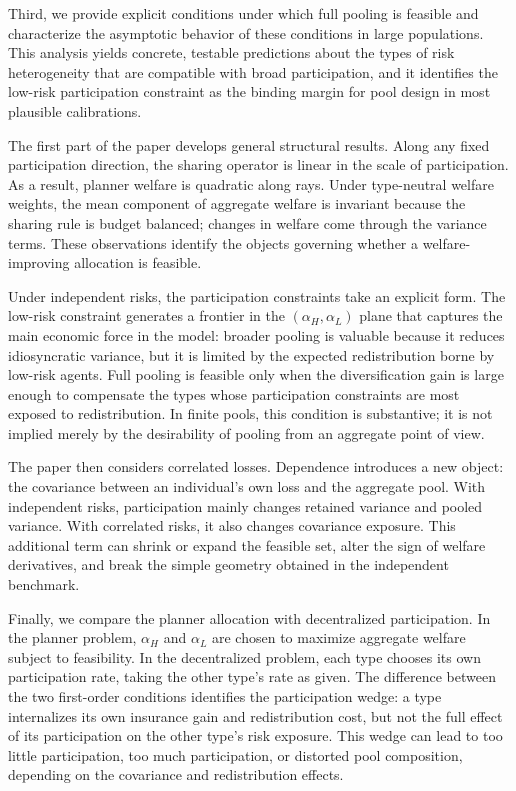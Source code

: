 \documentclass[a4paper,12pt]{article}
\theoremstyle{definition}
\theoremstyle{remark}
\newcommand{\1}{\mathbf{1}}
\begin{document}
Third, we provide explicit conditions under which full pooling is feasible and characterize the asymptotic behavior of these conditions in large populations. This analysis yields concrete, testable predictions about the types of risk heterogeneity that are compatible with broad participation, and it identifies the low-risk participation constraint as the binding margin for pool design in most plausible calibrations.

The first part of the paper develops general structural results. Along any fixed participation direction, the sharing operator is linear in the scale of participation. As a result, planner welfare is quadratic along rays. Under type-neutral welfare weights, the mean component of aggregate welfare is invariant because the sharing rule is budget balanced; changes in welfare come through the variance terms. These observations identify the objects governing whether a welfare-improving allocation is feasible.

Under independent risks, the participation constraints take an explicit form. The low-risk constraint generates a frontier in the \((\alpha_H,\alpha_L)\) plane that captures the main economic force in the model: broader pooling is valuable because it reduces idiosyncratic variance, but it is limited by the expected redistribution borne by low-risk agents. Full pooling is feasible only when the diversification gain is large enough to compensate the types whose participation constraints are most exposed to redistribution. In finite pools, this condition is substantive; it is not implied merely by the desirability of pooling from an aggregate point of view.

The paper then considers correlated losses. Dependence introduces a new object: the covariance between an individual's own loss and the aggregate pool. With independent risks, participation mainly changes retained variance and pooled variance. With correlated risks, it also changes covariance exposure. This additional term can shrink or expand the feasible set, alter the sign of welfare derivatives, and break the simple geometry obtained in the independent benchmark.

Finally, we compare the planner allocation with decentralized participation. In the planner problem, \(\alpha_H\) and \(\alpha_L\) are chosen to maximize aggregate welfare subject to feasibility. In the decentralized problem, each type chooses its own participation rate, taking the other type's rate as given. The difference between the two first-order conditions identifies the participation wedge: a type internalizes its own insurance gain and redistribution cost, but not the full effect of its participation on the other type's risk exposure. This wedge can lead to too little participation, too much participation, or distorted pool composition, depending on the covariance and redistribution effects.
\end{document}
